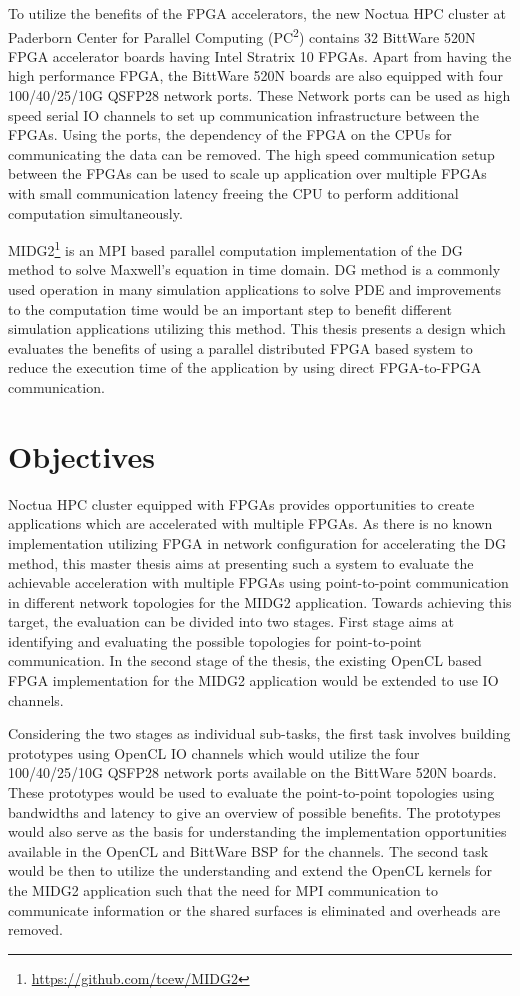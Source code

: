 To utilize the benefits of the FPGA accelerators, the new Noctua \ac{HPC} cluster at Paderborn Center for
Parallel Computing (PC\textsuperscript{2}) contains 32 BittWare 520N
FPGA accelerator boards having Intel Stratrix 10 FPGAs. Apart from having the high performance FPGA, the BittWare 520N boards
are also equipped with four 100/40/25/10G QSFP28 network ports. These Network ports can be used as
high speed serial IO channels to set up communication infrastructure between the FPGAs.
Using the ports, the dependency of the FPGA on the CPUs for communicating
the data can be removed. The high speed communication setup between the FPGAs can be used to scale
up application over multiple FPGAs with small communication latency freeing the CPU
to perform additional computation simultaneously.

MIDG2\footnote{\url{https://github.com/tcew/MIDG2}} is an \ac{MPI} based parallel computation
implementation of the \ac{DG} \cite{hesthaven_nodal_2008} method to solve Maxwell’s equation
in time domain. \ac{DG} method is a commonly used operation in many simulation applications to
solve \ac{PDE} and improvements to the computation time would be an important step to
benefit different simulation applications utilizing this method. This thesis presents
a design which evaluates the benefits of using a parallel distributed FPGA based system
to reduce the execution time of the application by using direct FPGA-to-FPGA communication.

\section{Objectives}

Noctua \ac{HPC} cluster equipped with FPGAs provides opportunities to create applications
which are accelerated with multiple FPGAs. As there is
no known implementation utilizing FPGA in network configuration for accelerating the
DG method, this master thesis aims at presenting such a system to evaluate
the achievable acceleration with multiple FPGAs using point-to-point communication in
different network topologies for the MIDG2 application. Towards achieving this target,
the evaluation can be divided into two stages. First stage aims at identifying
and evaluating the possible topologies for point-to-point communication. In the second
stage of the thesis, the existing OpenCL based FPGA implementation for
the MIDG2 application would be extended to use IO channels.

Considering the two stages as individual sub-tasks, the first task involves building
prototypes using OpenCL IO channels which would utilize the four 100/40/25/10G QSFP28
network ports available on the BittWare 520N boards. These prototypes would be used
to evaluate the point-to-point topologies using bandwidths and latency to give an
overview of possible benefits. The prototypes would also serve as the basis for
understanding the implementation opportunities available in the OpenCL and
BittWare BSP for the channels. The second task would be then to utilize the
understanding and extend the OpenCL kernels for the MIDG2 application
such that the need for \ac{MPI} communication to communicate information or the shared
surfaces is eliminated and overheads are removed.

